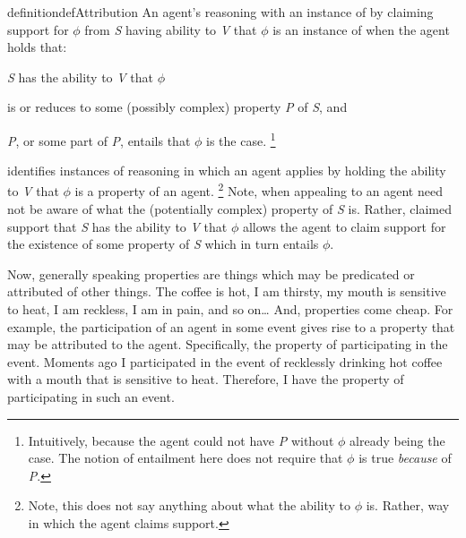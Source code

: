 \begin{note}
  \begin{restatable}[\AR{}]{definition}{defAttribution}\label{AR:def}
    An agent's reasoning with an instance of  by claiming support for \(\phi\) from \emph{S} having ability to \emph{V} that \(\phi\) is an instance of \emph{\AR{}} when the agent holds that:

    \emph{S} has the ability to \emph{V} that \(\phi\)
    \begin{enumerate*}[label=(\textsf{A}\arabic*), ref=(\textsf{A}\arabic*)]
    \item\label{A:s:1} is or reduces to some (possibly complex) property \emph{P} of \emph{S}, and
    \item\label{A:s:2} \emph{P}, or some part of \emph{P}, entails that \(\phi\) is the case.\nolinebreak
      \footnote{Intuitively, because the agent could not have \emph{P} without \(\phi\) already being the case.
      The notion of entailment here does not require that \(\phi\) is true \emph{because} of \emph{P}.}
    \end{enumerate*}
  \end{restatable}
  
  {
    \color{red}
    \AR{} identifies instances of reasoning in which an agent applies  by holding the ability to \emph{V} that \(\phi\) is a property of an agent.\nolinebreak
    \footnote{
      Note, this does not say anything about what the ability to \(\phi\) is.
      Rather, way in which the agent claims support.
    }
    Note, when appealing to  an agent need not be aware of what the (potentially complex) property of \emph{S} is.
    Rather, claimed support that \emph{S} has the ability to \emph{V} that \(\phi\) allows the agent to claim support for the existence of some property of \emph{S} which in turn entails \(\phi\).
  }

  Now, generally speaking properties are things which may be predicated or attributed of other things.
  The coffee is hot, I am thirsty, my mouth is sensitive to heat, I am reckless, I am in pain, and so on\dots
  And, properties come cheap.
  For example, the participation of an agent in some event gives rise to a property that may be attributed to the agent.
  Specifically, the property of participating in the event.
  Moments ago I participated in the event of recklessly drinking hot coffee with a mouth that is sensitive to heat.
  Therefore, I have the property of participating in such an event.


\end{note}
